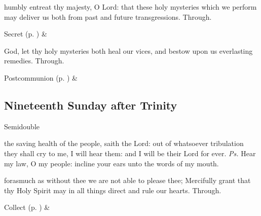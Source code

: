 
\secret
{} humbly entreat thy majesty, O Lord: that these holy mysteries which we perform may deliver us both from past and future transgressions. Through.
\begin{rubric}
     Secret  (p. \pageref{SPSaints}) \&  
\end{rubric}


\postcommunion
{} God, let thy holy mysteries both heal our vices, and bestow upon us everlasting remedies. Through.


\begin{rubric}
     Postcommunion  (p. \pageref{SPSaints}) \&  
\end{rubric}


\clearpage
\subsection{Nineteenth Sunday after Trinity}
\begin{inhead}
{Semidouble}
\end{inhead}


\introit
{} the saving health of the people, saith the Lord: out of whatsoever tribulation they shall cry to me, I will hear them: and I will be their Lord for ever. \textit{Ps.} Hear my law, O my people: incline your ears unto the words of my mouth.

\collect
{} forasmuch as without thee we are not able to please thee; Mercifully grant that thy Holy Spirit may in all things direct and rule our hearts. Through.
\begin{rubric}
     Collect  (p. \pageref{SPSaints}) \&  
\end{rubric}

